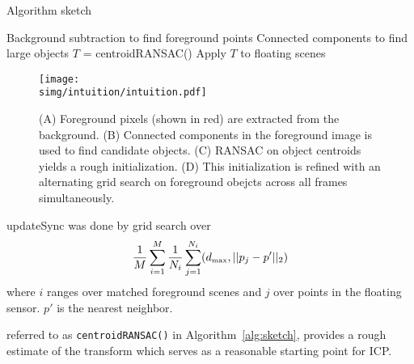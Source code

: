 \documentclass[letterpaper, 10 pt, conference]{ieeeconf}  %
\newcommand{\simg}{static_img}
\begin{document}
%
%
%

\begin{algorithm}
  \caption{Algorithm sketch}
  \label{alg:sketch}
  \SetLine
  \phantom{\;}
  Background subtraction to find foreground points\;
  Connected components to find large objects\;
  $T$ = centroidRANSAC()\;
  Apply $T$ to floating scenes\;
\end{algorithm}

\begin{figure*}
  \centering
  \texttt{[image: \\simg/intuition/intuition.pdf]}
  \caption{(A) Foreground pixels (shown in red) are extracted from the background. (B) Connected components in the foreground image is used to find candidate objects. (C) RANSAC on object centroids yields a rough initialization. (D) This initialization is refined with an alternating grid search on foreground obejcts across all frames simultaneously. }
  \label{fig:}
\end{figure*}


updateSync was done by grid search over
\newcommand{\dmax}{d_{\mbox{\tiny{max}}}}
\begin{align*}
  \frac{1}{M} \sum_{i=1}^M \frac{1}{N_i} \sum_{j=1}^{N_i}    (\dmax, ||p_j - p'||_2)
\end{align*}
where $i$ ranges over matched foreground scenes and $j$ over points in the floating sensor.  $p'$ is the nearest neighbor.


referred to as \texttt{centroidRANSAC()} in Algorithm~\ref{alg:sketch}, provides a rough estimate of the transform which serves as a reasonable starting point for ICP.
\end{document}
